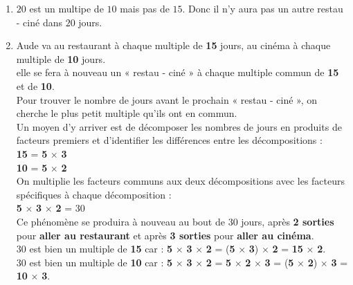 \begin{corrige}
    \begin{enumerate}
        \item $20$ est un multipe de $10$ mais pas de $15$. Donc il n'y aura pas un autre \og restau - ciné \fg dans $20$ jours.
        \item Aude va au restaurant à chaque multiple de {\bfseries \color{red}15} jours, au cinéma à chaque multiple de {\bfseries \color{green}10} jours.\\
        elle se fera à nouveau un « restau - ciné » à chaque multiple commun de {\bfseries \color{red}15} et de {\bfseries \color{green}10}.\\
        Pour trouver le nombre de jours avant le prochain « restau - ciné », on cherche le plus petit multiple qu'ils ont en commun.\\
        Un moyen d'y arriver est de décomposer les nombres de jours en produits de facteurs premiers et d'identifier les différences entre les décompositions :\\
{\bfseries \color{red}15} = {\bfseries \color{blue}5} $\times$ {\bfseries \color{red}3} \\
        {\bfseries \color{green}10} = {\bfseries \color{blue}5} $\times$ {\bfseries \color{green}2}\\
On multiplie les facteurs communs aux deux décompositions avec les facteurs spécifiques à chaque décomposition :\\
{\bfseries \color{blue}5} $\times$ {\bfseries \color{red}3} $\times$ {\bfseries \color{green}2} = 30\\
      Ce phénomène se produira à nouveau au bout de 30 jours, 
      après {\bfseries \color{green}2 sorties} pour {\bfseries \color{red}aller au restaurant} et après {\bfseries \color{red}3 sorties} pour {\bfseries \color{green}aller au cinéma}.\\
30 est bien un multiple de {\bfseries \color{red}15} car :
         {\bfseries \color{blue}5} $\times$ {\bfseries \color{red}3} $\times$ {\bfseries \color{green}2} =
         ({\bfseries \color{blue}5} $\times$ {\bfseries \color{red}3}) $\times$ {\bfseries \color{green}2} =
         {\bfseries \color{red}15} $\times$ {\bfseries \color{green}2}.\\
        30 est bien un multiple de {\bfseries \color{green}10} car :
         {\bfseries \color{blue}5} $\times$ {\bfseries \color{red}3} $\times$ {\bfseries \color{green}2} =
         {\bfseries \color{blue}5} $\times$ {\bfseries \color{green}2} $\times$ {\bfseries \color{red}3} =
         ({\bfseries \color{blue}5} $\times$ {\bfseries \color{green}2}) $\times$ {\bfseries \color{red}3} =
         {\bfseries \color{green}10} $\times$ {\bfseries \color{red}3}.\\
    \end{enumerate}


\end{corrige}


